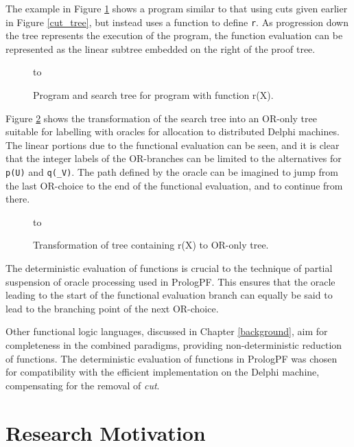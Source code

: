 The example in Figure \ref{fun_tree3} shows a program similar to that using cuts given
earlier in Figure \ref{cut_tree}, but instead uses a function to define \texttt{r}.
As progression down the tree represents the execution of the program, the function
evaluation can be represented as the linear subtree embedded on the right of the
proof tree.

\begin{figure}[h]
\vspace{5mm} \hbox to 
\caption{Program and search tree for program with function r(X).}
\vspace{5mm}
\label{fun_tree3}
\end{figure}

Figure \ref{fun_tree4} shows the transformation of the search tree into an
OR-only tree suitable for labelling with oracles for allocation to
distributed Delphi machines.  The linear portions due to the functional evaluation
can be seen, and it is clear that the integer labels of the OR-branches can
be limited to the alternatives for \texttt{p(U)} and \texttt{q(\_{}V)}. The path
defined by the oracle can be imagined to jump from the last OR-choice to the
end of the functional evaluation, and to continue from there.

\begin{figure}[h]
\vspace{5mm} \hbox to 
\caption{Transformation of tree containing r(X) to OR-only tree.}
\vspace{5mm}
\label{fun_tree4}
\end{figure}

The deterministic evaluation of functions is crucial to the 
technique of partial suspension of
oracle processing used in PrologPF.  This ensures that the oracle leading to the 
start of the functional evaluation branch can equally be said to lead to the 
branching point of the next OR-choice.

Other functional logic languages, discussed in  Chapter \ref{background},
aim for completeness in the combined paradigms, providing non-deterministic
reduction of functions.  The deterministic evaluation of functions in PrologPF
was chosen for compatibility with the efficient implementation on the
Delphi machine, compensating for the removal of \textit{cut}.

\section{Research Motivation} %

